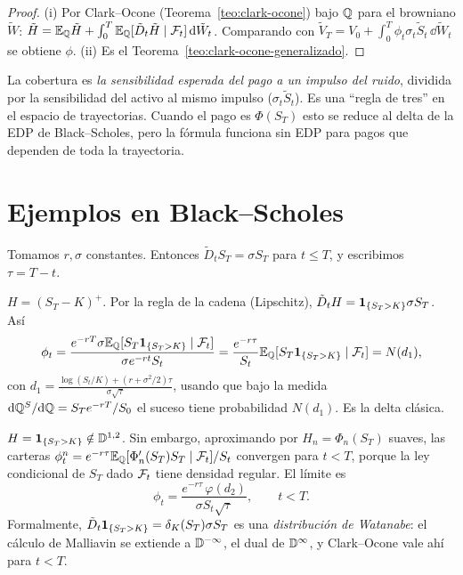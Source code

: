 \begin{proof}
(i) Por Clark--Ocone (Teorema~\ref{teo:clark-ocone}) bajo $\mathbb{Q}$ para el browniano $\tilde W$: $\tilde H=\mathbb{E}_{\mathbb{Q}}\tilde H+
\int_0^T\mathbb{E}_{\mathbb{Q}}[\tilde D_t\tilde H\mid\mathcal{F}_t]\,\mathrm{d}\tilde W_t$. Comparando con $\tilde V_T=V_0+\int_0^T\phi_t\sigma_t\tilde S_t\,\dd\tilde W_t$ se obtiene $\phi$. (ii) Es el
Teorema~\ref{teo:clark-ocone-generalizado}.
\end{proof}

\begin{intuicion}
La cobertura es \emph{la sensibilidad esperada del pago a un impulso del ruido}, dividida por la
sensibilidad del activo al mismo impulso ($\sigma_t\tilde S_t$). Es una ``regla de tres'' en el espacio de
trayectorias. Cuando el pago es $\Phi(S_T)$ esto se reduce al delta de la EDP de Black--Scholes,
pero la fórmula funciona sin EDP para pagos que dependen de toda la trayectoria.
\end{intuicion}

\section{Ejemplos en Black--Scholes}
Tomamos $r,\sigma$ constantes. Entonces $\tilde D_tS_T=\sigma S_T$ para $t\le T$, y escribimos $\tau=T-t$.

\begin{ejemplo}
$H=(S_T-K)^+$. Por la regla de la cadena (Lipschitz),
$\tilde D_tH=\mathbf{1}_{\{S_T>K\}}\sigma S_T$. Así
\[
  \phi_t=\frac{e^{-rT}\sigma\mathbb{E}_{\mathbb{Q}}[S_T\mathbf{1}_{\{S_T>K\}}\mid\mathcal{F}_t]}{\sigma e^{-rt}S_t}=\frac{e^{-r\tau}}{S_t}\mathbb{E}_{\mathbb{Q}}[S_T\mathbf{1}_{\{S_T>K\}}\mid\mathcal{F}_t]=N(d_1),
\]
con $d_1=\frac{\log(S_t/K)+(r+\sigma^2/2)\tau}{\sigma\sqrt\tau}$, usando que bajo la medida $\mathrm{d}\mathbb{Q}^S/\mathrm{d}\mathbb{Q}=S_Te^{-rT}/S_0$ el suceso tiene
probabilidad $N(d_1)$. Es la delta clásica.
\end{ejemplo}

\begin{ejemplo}[Digital]
$H=\mathbf{1}_{\{S_T>K\}}\notin\mathbb{D}^{1,2}$. Sin embargo, aproximando por $H_n=\Phi_n(S_T)$
suaves, las carteras $\phi^n_t=e^{-r\tau}\mathbb{E}_{\mathbb{Q}}[\Phi_n'(S_T)S_T\mid\mathcal{F}_t]/S_t$ convergen para $t<T$, porque la ley
condicional de $S_T$ dado $\mathcal{F}_t$ tiene densidad regular. El límite es
\[
  \phi_t=\frac{e^{-r\tau}\,\varphi(d_2)}{\sigma S_t\sqrt\tau},\qquad t<T.
\]
Formalmente, $\tilde D_t\mathbf{1}_{\{S_T>K\}}=\delta_K(S_T)\sigma S_T$ es una \emph{distribución de Watanabe}: el cálculo de Malliavin
se extiende a $\mathbb{D}^{-\infty}$, el dual de $\mathbb{D}^\infty$, y Clark--Ocone vale ahí para $t<T$.
\end{ejemplo}

